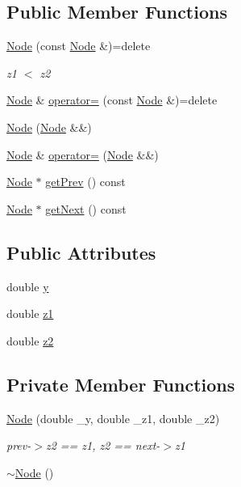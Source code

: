 \subsection*{Public Member Functions}
\begin{DoxyCompactItemize}
\item 
\hyperlink{structContourList_1_1Node_aa5a6173b45499956934fea3f0f988937}{Node} (const \hyperlink{structContourList_1_1Node}{Node} \&)=delete
\begin{DoxyCompactList}\small\item\em z1 $<$ z2 \end{DoxyCompactList}\item 
\hyperlink{structContourList_1_1Node}{Node} \& \hyperlink{structContourList_1_1Node_a034f1203c181859eff8925b7f3549f37}{operator=} (const \hyperlink{structContourList_1_1Node}{Node} \&)=delete
\item 
\hyperlink{structContourList_1_1Node_abfb23cff73a9962b3afdb1de1d6457ea}{Node} (\hyperlink{structContourList_1_1Node}{Node} \&\&)
\item 
\hyperlink{structContourList_1_1Node}{Node} \& \hyperlink{structContourList_1_1Node_abe42cd30fcddd8ba4f7a486b61f5108c}{operator=} (\hyperlink{structContourList_1_1Node}{Node} \&\&)
\item 
\hyperlink{structContourList_1_1Node}{Node} $\ast$ \hyperlink{structContourList_1_1Node_a14a3d76c3eedeb27c589d4863f618fb9}{get\+Prev} () const 
\item 
\hyperlink{structContourList_1_1Node}{Node} $\ast$ \hyperlink{structContourList_1_1Node_a1a7a77c38775ce6d5c5a55227b0d9094}{get\+Next} () const 
\end{DoxyCompactItemize}
\subsection*{Public Attributes}
\begin{DoxyCompactItemize}
\item 
double \hyperlink{structContourList_1_1Node_ac371d90797c06c6b6a6de40e21d17110}{y}
\item 
double \hyperlink{structContourList_1_1Node_acf3193319486884386610f80a4681014}{z1}
\item 
double \hyperlink{structContourList_1_1Node_a5274d7d4c01c5205fb6dec2dd0065e11}{z2}
\end{DoxyCompactItemize}
\subsection*{Private Member Functions}
\begin{DoxyCompactItemize}
\item 
\hyperlink{structContourList_1_1Node_ac4e773feed1974871bd67d8d9575d3b9}{Node} (double \+\_\+y, double \+\_\+z1, double \+\_\+z2)
\begin{DoxyCompactList}\small\item\em prev-\/$>$z2 == z1, z2 == next-\/$>$z1 \end{DoxyCompactList}\item 
\hyperlink{structContourList_1_1Node_ab72fe952af587647a855c57497e19bc0}{$\sim$\+Node} ()
\end{DoxyCompactItemize}
